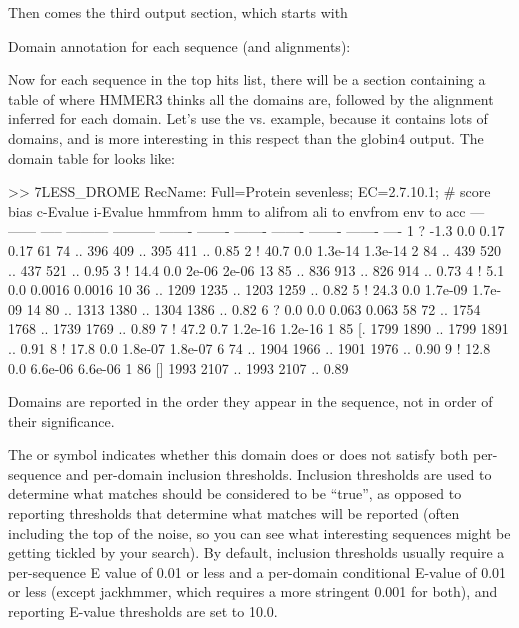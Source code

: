 Then comes the third output section, which starts with

\begin{sreoutput}
Domain annotation for each sequence (and alignments):
\end{sreoutput}

Now for each sequence in the top hits list, there will be a section 
containing a table of where HMMER3 thinks all the domains are,
followed by the alignment inferred for each domain. Let's use the
 vs.  example, because it contains lots
of domains, and is more interesting in this respect than the globin4
output.  The domain table for  looks like:

\begin{sreoutput}
>> 7LESS_DROME  RecName: Full=Protein sevenless;          EC=2.7.10.1;
   #    score  bias  c-Evalue  i-Evalue hmmfrom  hmm to    alifrom  ali to    envfrom  env to     acc
 ---   ------ ----- --------- --------- ------- -------    ------- -------    ------- -------    ----
   1 ?   -1.3   0.0      0.17      0.17      61      74 ..     396     409 ..     395     411 .. 0.85
   2 !   40.7   0.0   1.3e-14   1.3e-14       2      84 ..     439     520 ..     437     521 .. 0.95
   3 !   14.4   0.0     2e-06     2e-06      13      85 ..     836     913 ..     826     914 .. 0.73
   4 !    5.1   0.0    0.0016    0.0016      10      36 ..    1209    1235 ..    1203    1259 .. 0.82
   5 !   24.3   0.0   1.7e-09   1.7e-09      14      80 ..    1313    1380 ..    1304    1386 .. 0.82
   6 ?    0.0   0.0     0.063     0.063      58      72 ..    1754    1768 ..    1739    1769 .. 0.89
   7 !   47.2   0.7   1.2e-16   1.2e-16       1      85 [.    1799    1890 ..    1799    1891 .. 0.91
   8 !   17.8   0.0   1.8e-07   1.8e-07       6      74 ..    1904    1966 ..    1901    1976 .. 0.90
   9 !   12.8   0.0   6.6e-06   6.6e-06       1      86 []    1993    2107 ..    1993    2107 .. 0.89
\end{sreoutput}

Domains are reported in the order they appear in the sequence, not in
order of their significance.

The \ccode{!} or  symbol indicates whether this domain does
or does not satisfy both per-sequence and per-domain inclusion
thresholds. Inclusion thresholds are used to determine what matches
should be considered to be ``true'', as opposed to reporting
thresholds that determine what matches will be reported (often
including the top of the noise, so you can see what interesting
sequences might be getting tickled by your search). By default,
inclusion thresholds usually require a per-sequence E value of 0.01 or
less and a per-domain conditional E-value of 0.01 or less (except
jackhmmer, which requires a more stringent 0.001 for both), and
reporting E-value thresholds are set to 10.0.

